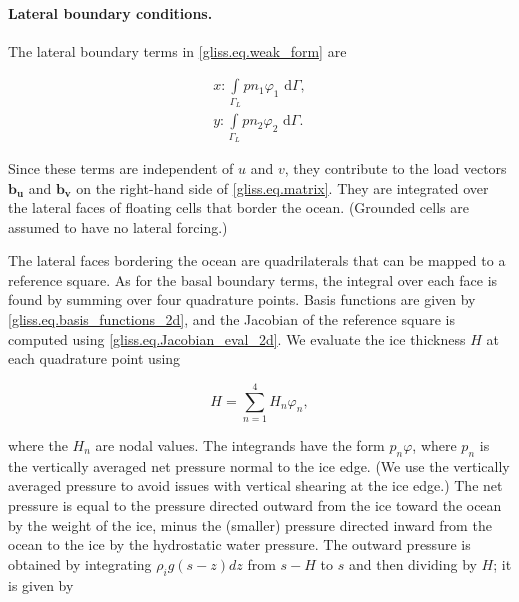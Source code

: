 \paragraph{Lateral boundary conditions.}

The lateral boundary terms in \eqref{gliss.eq.weak_form} are

\begin{equation}
  \label{gliss.eq.lateral_bc}
  \begin{split}
    x: \int\limits_{{\Gamma }_{L}} {p n_1 {{\varphi }_{1}} \text{ d}\Gamma}, \\
    y: \int\limits_{{\Gamma }_{L}} {p n_2 {{\varphi }_{2}} \text{ d}\Gamma}.
  \end{split}
\end{equation}

\noindent
Since these terms are independent of $u$ and $v$, they contribute to the load vectors
$\mathbf{b_u}$ and $\mathbf{b_v}$ on the right-hand side of \eqref{gliss.eq.matrix}.
They are integrated over the lateral faces of floating cells that border the ocean.
(Grounded cells are assumed to have no lateral forcing.)

The lateral faces bordering the ocean are quadrilaterals that can be mapped to a reference square.
As for the basal boundary terms, the integral over each face is found by 
summing over four quadrature points.
Basis functions are given by \eqref{gliss.eq.basis_functions_2d}, and
the Jacobian of the reference square is computed using \eqref{gliss.eq.Jacobian_eval_2d}.
We evaluate the ice thickness $H$ at each quadrature point using

\begin{equation}
  \label{gliss.eq.thickness_qp}
  H = \sum\limits_{n=1}^{4} {H_n \varphi_n},
\end{equation}

\noindent
where the $H_n$ are nodal values.
The integrands have the form $p_n \varphi$, where $p_n$ is the vertically averaged
net pressure normal to the ice edge.  
(We use the vertically averaged pressure to avoid issues with vertical shearing at the ice edge.)
The net pressure is equal to the pressure
directed outward from the ice toward the ocean by the weight of the ice, minus the (smaller)
pressure directed inward from the ocean to the ice by the hydrostatic water pressure.
The outward pressure is obtained by integrating $\rho_i g (s-z) dz$ from $s-H$ to $s$
and then dividing by $H$; it is given by 

